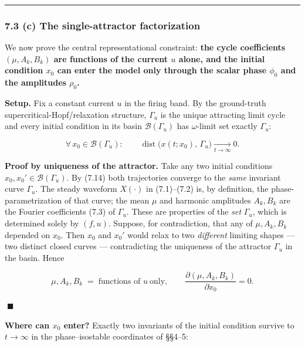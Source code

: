 \documentclass[
  11pt,
]{article}
\begin{document}
\begin{center}\rule{0.5\linewidth}{0.5pt}\end{center}

\subsubsection{7.3 (c) The single-attractor
factorization}\label{c-the-single-attractor-factorization}

We now prove the central representational constraint: \textbf{the cycle
coefficients \((\mu,A_k,B_k)\) are functions of the current \(u\) alone,
and the initial condition \(x_0\) can enter the model only through the
scalar phase \(\phi_0\) and the amplitudes \(\rho_0\).}

\textbf{Setup.} Fix a constant current \(u\) in the firing band. By the
ground-truth supercritical-Hopf/relaxation structure, \(\Gamma_u\) is
the unique attracting limit cycle and every initial condition in its
basin \(\mathcal B(\Gamma_u)\) has \(\omega\)-limit set exactly
\(\Gamma_u\):

\[
\forall\,x_0\in\mathcal B(\Gamma_u):\qquad \operatorname{dist}\big(x(t;x_0),\,\Gamma_u\big)\xrightarrow[t\to\infty]{}0. \tag{7.14}
\]

\textbf{Proof by uniqueness of the attractor.} Take any two initial
conditions \(x_0,x_0'\in\mathcal B(\Gamma_u)\). By (7.14) both
trajectories converge to the \emph{same} invariant curve \(\Gamma_u\).
The steady waveform \(X(\cdot)\) in (7.1)--(7.2) is, by definition, the
phase-parametrization of that curve; the mean \(\mu\) and harmonic
amplitudes \(A_k,B_k\) are the Fourier coefficients (7.3) of
\(\Gamma_u\). These are properties of the \emph{set} \(\Gamma_u\), which
is determined solely by \((f,u)\). Suppose, for contradiction, that any
of \(\mu,A_k,B_k\) depended on \(x_0\). Then \(x_0\) and \(x_0'\) would
relax to two \emph{different} limiting shapes --- two distinct closed
curves --- contradicting the uniqueness of the attractor \(\Gamma_u\) in
the basin. Hence

\[
\mu,A_k,B_k \;=\; \text{functions of }u\ \text{only},\qquad \frac{\partial(\mu,A_k,B_k)}{\partial x_0}=0. \tag{7.15}
\]

\(\;\blacksquare\)

\textbf{Where can \(x_0\) enter?} Exactly two invariants of the initial
condition survive to \(t\to\infty\) in the phase--isostable coordinates
of §§4--5:
\end{document}
